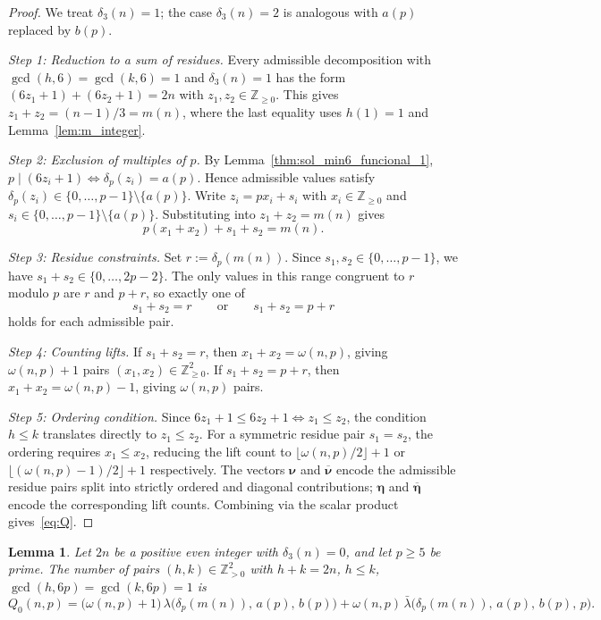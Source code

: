 \documentclass[12pt]{article}
\newtheorem{lemma}[theorem]{Lemma}
\begin{document}
\begin{proof}
We treat $\delta_3(n)=1$; the case $\delta_3(n)=2$ is analogous
with $a(p)$ replaced by $b(p)$.

\textit{Step 1: Reduction to a sum of residues.}
Every admissible decomposition with $\gcd(h,6)=\gcd(k,6)=1$
and $\delta_3(n)=1$ has the form
$(6z_1+1)+(6z_2+1)=2n$ with $z_1,z_2 \in \mathbb{Z}_{\ge 0}$.
This gives $z_1+z_2=(n-1)/3=m(n)$,
where the last equality uses $h(1)=1$ and Lemma~\ref{lem:m_integer}.

\textit{Step 2: Exclusion of multiples of $p$.}
By Lemma~\ref{thm:sol_min6_funcional_1},
$p \mid (6z_i+1) \iff \delta_p(z_i)=a(p)$.
Hence admissible values satisfy
$\delta_p(z_i) \in \{0,\dots,p-1\}\setminus\{a(p)\}$.
Write $z_i=px_i+s_i$ with $x_i \in \mathbb{Z}_{\ge 0}$ and
$s_i \in \{0,\dots,p-1\}\setminus\{a(p)\}$.
Substituting into $z_1+z_2=m(n)$ gives
\[
p(x_1+x_2)+s_1+s_2=m(n).
\]

\textit{Step 3: Residue constraints.}
Set $r:=\delta_p(m(n))$. Since $s_1,s_2 \in \{0,\dots,p-1\}$,
we have $s_1+s_2 \in \{0,\dots,2p-2\}$.
The only values in this range congruent to $r$ modulo $p$ are
$r$ and $p+r$, so exactly one of
\[
s_1+s_2=r
\qquad\text{or}\qquad
s_1+s_2=p+r
\]
holds for each admissible pair.

\textit{Step 4: Counting lifts.}
If $s_1+s_2=r$, then $x_1+x_2=\omega(n,p)$,
giving $\omega(n,p)+1$ pairs $(x_1,x_2) \in \mathbb{Z}_{\ge 0}^2$.
If $s_1+s_2=p+r$, then $x_1+x_2=\omega(n,p)-1$,
giving $\omega(n,p)$ pairs.

\textit{Step 5: Ordering condition.}
Since $6z_1+1 \le 6z_2+1 \iff z_1 \le z_2$, the condition
$h \le k$ translates directly to $z_1 \le z_2$.
For a symmetric residue pair $s_1=s_2$, the ordering requires
$x_1 \le x_2$, reducing the lift count to
$\lfloor\omega(n,p)/2\rfloor+1$ or
$\lfloor(\omega(n,p)-1)/2\rfloor+1$ respectively.
The vectors $\bm{\nu}$ and $\overline{\bm{\nu}}$ encode the
admissible residue pairs split into strictly ordered and diagonal
contributions; $\bm{\eta}$ and $\overline{\bm{\eta}}$ encode
the corresponding lift counts.
Combining via the scalar product gives~\eqref{eq:Q}.
\end{proof}

\begin{lemma}\label{lema:conteo_soluciones_0}
Let $2n$ be a positive even integer with $\delta_3(n)=0$,
and let $p \ge 5$ be prime.
The number of pairs $(h,k) \in \mathbb{Z}_{>0}^2$ with
$h+k=2n$, $h \le k$, $\gcd(h,6p)=\gcd(k,6p)=1$ is
\begin{equation}\label{eq:Q0}
Q_0(n,p)
=
\bigl(\omega(n,p)+1\bigr)\,
\lambda\!\bigl(\delta_p(m(n)),\,a(p),\,b(p)\bigr)
+
\omega(n,p)\,
\bar{\lambda}\!\bigl(\delta_p(m(n)),\,a(p),\,b(p),\,p\bigr).
\end{equation}
\end{lemma}
\end{document}
